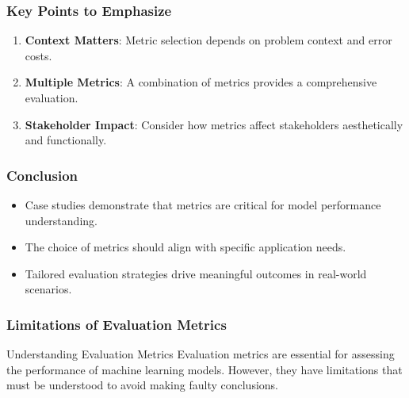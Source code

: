 \documentclass[aspectratio=169]{beamer}
\begin{document}
\begin{frame}[fragile]
    \frametitle{Key Points to Emphasize}
    \begin{enumerate}
        \item \textbf{Context Matters}: Metric selection depends on problem context and error costs.
        \item \textbf{Multiple Metrics}: A combination of metrics provides a comprehensive evaluation.
        \item \textbf{Stakeholder Impact}: Consider how metrics affect stakeholders aesthetically and functionally.
    \end{enumerate}
\end{frame}

\begin{frame}[fragile]
    \frametitle{Conclusion}
    \begin{itemize}
        \item Case studies demonstrate that metrics are critical for model performance understanding.
        \item The choice of metrics should align with specific application needs.
        \item Tailored evaluation strategies drive meaningful outcomes in real-world scenarios.
    \end{itemize}
\end{frame}

\begin{frame}[fragile]
    \frametitle{Limitations of Evaluation Metrics}
    \begin{block}{Understanding Evaluation Metrics}
        Evaluation metrics are essential for assessing the performance of machine learning models. However, they have limitations that must be understood to avoid making faulty conclusions.
    \end{block}
\end{frame}
\end{document}

